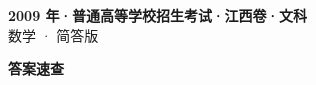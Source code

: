 \documentclass[zihao=-4, a4paper]{ctexart}
\begin{document}
\begin{center}
  {\Large\bfseries 2009 年·普通高等学校招生考试·江西卷·文科}\\[4pt]
  {\large 数学 · 简答版}
\end{center}
\medskip
{}

\clearpage
{}
\begin{center}{\Large\bfseries 答案速查}\end{center}
\medskip

\end{document}
